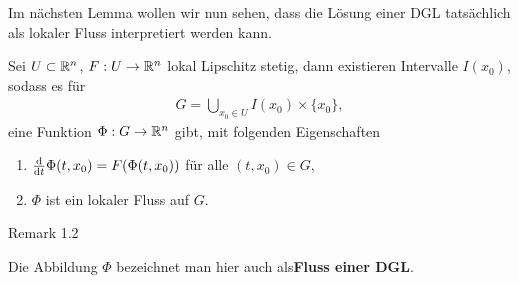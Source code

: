 Im nächsten Lemma wollen wir nun sehen, dass die Lösung einer DGL tatsächlich als lokaler Fluss interpretiert werden kann.
\label{ode/fluesse:lemma-3}
\begin{lemma}{}{}



Sei \(U\subset\mathbb{R}^n\), \(F:U \rightarrow \mathbb{R}^n\) lokal Lipschitz stetig, dann existieren Intervalle \(I(x_0)\), sodass es für
\begin{align*}
G = \bigcup_{x_0\in U} I(x_0)\times\{x_0\},
\end{align*}
eine Funktion \(\Phi:G\rightarrow \mathbb{R}^n\) gibt, mit folgenden Eigenschaften
\begin{enumerate}

\item {} 
\(\frac{\mathrm{d}}{\mathrm{d} t} \Phi(t, x_0) = F(\Phi(t, x_0))\) für alle \((t,x_0)\in G\),

\item {} 
\(\Phi\) ist ein lokaler Fluss auf \(G\).

\end{enumerate}
\end{lemma}
\label{ode/fluesse:remark-4}
\begin{emphBox}{}{}{Remark 1.2}



Die Abbildung \(\Phi\) bezeichnet man hier auch als\textbf{Fluss einer DGL}.
\end{emphBox}

